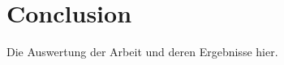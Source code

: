 \chapter{Conclusion}
\label{cha:conclusion}

Die Auswertung der Arbeit und deren Ergebnisse hier.


